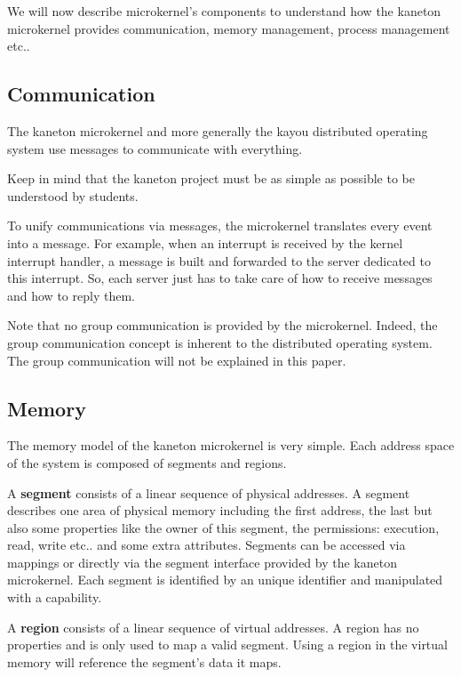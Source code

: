 \begin{multicols}{2}
We will now describe microkernel's components to understand how the kaneton
microkernel provides communication, memory management, process management etc..

%
%

\subsection{Communication}

The kaneton microkernel and more generally the kayou distributed operating
system use messages to communicate with everything.

Keep in mind that the kaneton project must be as simple as possible to be
understood by students.

To unify communications via messages, the microkernel translates every event
into a message. For example, when an interrupt is received by the kernel
interrupt handler, a message is built and forwarded to the server dedicated
to this interrupt. So, each server just has to take care of how to receive
messages and how to reply them.

Note that no group communication is provided by the microkernel. Indeed, the
group communication concept is inherent to the distributed operating system.
The group communication will not be explained in this paper.

%
%

\subsection{Memory}

The memory model of the kaneton microkernel is very simple. Each address space
of the system is composed of segments and regions.

A \textbf{segment} consists of a linear sequence of physical addresses.
A segment describes one area of physical memory including the
first address, the last but also some properties like the owner of this
segment, the permissions: execution, read, write etc.. and some
extra attributes. Segments can be accessed via mappings or directly via
the segment interface provided by the kaneton microkernel. Each segment
is identified by an unique identifier and manipulated with a capability.

A \textbf{region} consists of a linear sequence of virtual addresses.
A region has no properties and is only used to map a valid segment.
Using a region in the virtual memory will reference the segment's data
it maps.


\end{multicols}
